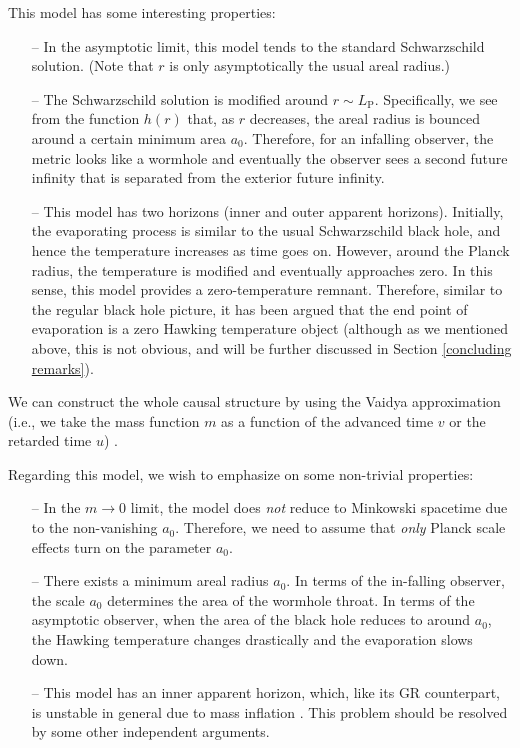 \documentclass[12pt]{article}
\newcommand{\2}{$^2$}
\newcommand{\3}{$^3$}
\newcommand{\4}{$_4$}
\newcommand{\5}{$_5$}
\begin{document}
This model has some interesting properties:
\begin{itemize}
\item[--] In the asymptotic limit, this model tends to the standard Schwarzschild solution. (Note that $r$ is only asymptotically the usual areal radius.)
\item[--] The Schwarzschild solution is modified around $r \sim L_{\mathrm{P}}$. Specifically, we see from the function $h(r)$ that, as $r$ decreases, the areal radius is bounced around a certain minimum area $a_{0}$. Therefore, for an infalling observer, the metric looks like a wormhole and eventually the observer sees a second future infinity that is separated from the exterior future infinity.
\item[--] This model has two horizons (inner and outer apparent horizons). Initially, the evaporating process is similar to the usual Schwarzschild black hole, and hence the temperature increases as time goes on. However, around the Planck radius, the temperature is modified and eventually approaches zero. In this sense, this model provides a zero-temperature remnant. Therefore, similar to the regular black hole picture, it has been argued that the end point of evaporation is a zero Hawking temperature object (although as we mentioned above, this is not obvious, and will be further discussed in Section \ref{concluding remarks}). 
\end{itemize}
We can construct the whole causal structure by using the Vaidya approximation (i.e., we take the mass function $m$ as a function of the advanced time $v$ or the retarded time $u$) \cite{Hossenfelder:2009fc}.

Regarding this model, we wish to emphasize on some non-trivial properties:
\begin{itemize}
\item[--] In the $m \rightarrow 0$ limit, the model does \emph{not} reduce to Minkowski spacetime due to the non-vanishing $a_{0}$. Therefore, we need to assume that \emph{only} Planck scale effects turn on the parameter $a_{0}$.
\item[--] There exists a minimum areal radius $a_{0}$. In terms of the in-falling observer, the scale $a_{0}$ determines the area of the wormhole throat. In terms of the asymptotic observer, when the area of the black hole reduces to around $a_{0}$, the Hawking temperature changes drastically and the evaporation slows down. 
\item[--] This model has an inner apparent horizon, which, like its GR counterpart, is unstable in general due to mass inflation \cite{Brown:2011tv}. This problem should be resolved by some other independent arguments.
\end{itemize}
\end{document}
